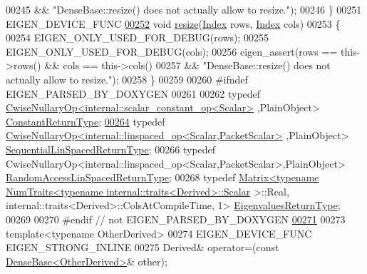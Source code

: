\begin{DoxyCode}
00245                 && \textcolor{stringliteral}{"DenseBase::resize() does not actually allow to resize."});
00246     \}
00251     EIGEN\_DEVICE\_FUNC
\hyperlink{group___core___module_aef40c2ee48a85a799270c8258cc12b76}{00252}     \textcolor{keywordtype}{void} \hyperlink{group___core___module_aef40c2ee48a85a799270c8258cc12b76}{resize}(\hyperlink{namespace_eigen_a62e77e0933482dafde8fe197d9a2cfde}{Index} rows, \hyperlink{namespace_eigen_a62e77e0933482dafde8fe197d9a2cfde}{Index} cols)
00253     \{
00254       EIGEN\_ONLY\_USED\_FOR\_DEBUG(rows);
00255       EIGEN\_ONLY\_USED\_FOR\_DEBUG(cols);
00256       eigen\_assert(rows == this->rows() && cols == this->cols()
00257                 && \textcolor{stringliteral}{"DenseBase::resize() does not actually allow to resize."});
00258     \}
00259 
00260 \textcolor{preprocessor}{#ifndef EIGEN\_PARSED\_BY\_DOXYGEN}
00261 
00262     \textcolor{keyword}{typedef} \hyperlink{group___core___module_class_eigen_1_1_cwise_nullary_op}{CwiseNullaryOp<internal::scalar\_constant\_op<Scalar>}
      ,PlainObject> \hyperlink{group___core___module_class_eigen_1_1_cwise_nullary_op}{ConstantReturnType};
\hyperlink{group___core___module_a6cdf27f6b825097f86fc6bcdbeed9e65}{00264}     \textcolor{keyword}{typedef} \hyperlink{group___core___module_class_eigen_1_1_cwise_nullary_op}{CwiseNullaryOp<internal::linspaced\_op<Scalar,PacketScalar>}
      ,PlainObject> \hyperlink{group___core___module_class_eigen_1_1_cwise_nullary_op}{SequentialLinSpacedReturnType};
00266     \textcolor{keyword}{typedef} CwiseNullaryOp<internal::linspaced\_op<Scalar,PacketScalar>,PlainObject> 
      \hyperlink{group___core___module_class_eigen_1_1_cwise_nullary_op}{RandomAccessLinSpacedReturnType};
00268     \textcolor{keyword}{typedef} \hyperlink{group___core___module_class_eigen_1_1_matrix}{Matrix<typename NumTraits<typename internal::traits<Derived>::Scalar}
      >::Real, internal::traits<Derived>::ColsAtCompileTime, 1> \hyperlink{group___core___module_class_eigen_1_1_matrix}{EigenvaluesReturnType};
00269 
00270 \textcolor{preprocessor}{#endif // not EIGEN\_PARSED\_BY\_DOXYGEN}
\hyperlink{group___core___module_a805284f5f60a6deefb5b1892d02b0f9e}{00271} 
00273     \textcolor{keyword}{template}<\textcolor{keyword}{typename} OtherDerived>
00274     EIGEN\_DEVICE\_FUNC EIGEN\_STRONG\_INLINE
00275     Derived& operator=(\textcolor{keyword}{const} \hyperlink{group___core___module_class_eigen_1_1_dense_base}{DenseBase<OtherDerived>}& other);

\end{DoxyCode}
